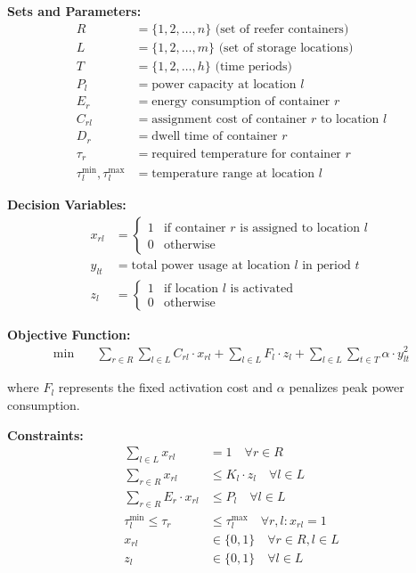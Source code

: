 \documentclass{article}
\begin{document}
\textbf{Sets and Parameters:}
\begin{align}
R &= \{1, 2, \ldots, n\} \text{ (set of reefer containers)} \\
L &= \{1, 2, \ldots, m\} \text{ (set of storage locations)} \\
T &= \{1, 2, \ldots, h\} \text{ (time periods)} \\
P_l &= \text{power capacity at location } l \\
E_r &= \text{energy consumption of container } r \\
C_{rl} &= \text{assignment cost of container } r \text{ to location } l \\
D_{r} &= \text{dwell time of container } r \\
\tau_r &= \text{required temperature for container } r \\
\tau_l^{\min}, \tau_l^{\max} &= \text{temperature range at location } l
\end{align}

\textbf{Decision Variables:}
\begin{align}
x_{rl} &= \begin{cases} 
1 & \text{if container } r \text{ is assigned to location } l \\
0 & \text{otherwise}
\end{cases} \\
y_{lt} &= \text{total power usage at location } l \text{ in period } t \\
z_l &= \begin{cases}
1 & \text{if location } l \text{ is activated} \\
0 & \text{otherwise}
\end{cases}
\end{align}

\textbf{Objective Function:}
\begin{align}
\min \quad & \sum_{r \in R} \sum_{l \in L} C_{rl} \cdot x_{rl} + \sum_{l \in L} F_l \cdot z_l + \sum_{l \in L} \sum_{t \in T} \alpha \cdot y_{lt}^2
\end{align}

where $F_l$ represents the fixed activation cost and $\alpha$ penalizes peak power consumption.

\textbf{Constraints:}
\begin{align}
\sum_{l \in L} x_{rl} &= 1 \quad \forall r \in R \tag{assignment} \\
\sum_{r \in R} x_{rl} &\leq K_l \cdot z_l \quad \forall l \in L \tag{capacity} \\
\sum_{r \in R} E_r \cdot x_{rl} &\leq P_l \quad \forall l \in L \tag{power} \\
\tau_l^{\min} \leq \tau_r &\leq \tau_l^{\max} \quad \forall r,l : x_{rl} = 1 \tag{temperature} \\
x_{rl} &\in \{0,1\} \quad \forall r \in R, l \in L \\
z_l &\in \{0,1\} \quad \forall l \in L
\end{align}
\end{document}

